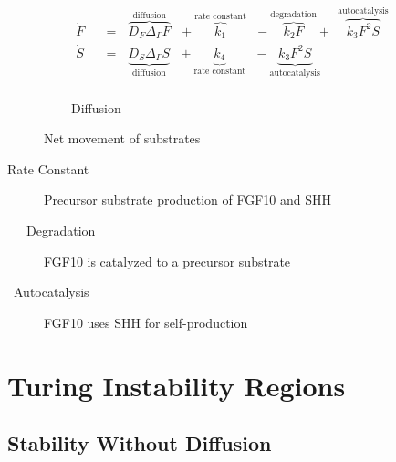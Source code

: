 \documentclass{beamer}
\begin{document}
            \begin{frame}{\insertsubsectionhead}
                
                
                \begin{equation*}
                    \begin{aligned}
                    \dot{F} ~~~
                     &=~~~ \overbrace{D_F\Delta_\Gamma F}^\text{diffusion} ~~~
                    +\overbrace{k_1}^\text{rate constant} 
                    ~~~- \overbrace{k_2F}^\text{degradation} + 
                    ~~\overbrace{k_3F^2S}^\text{autocatalysis}&  \\
                    \dot{S} ~~~ 
                     &=~~~ \underbrace{D_S\Delta_\Gamma S}_\text{diffusion} 
                    ~~~+\underbrace{k_4}_\text{rate constant} 
                    ~~~-\underbrace{k_3F^2S}_\text{autocatalysis}&  \\
                    \end{aligned}
                \end{equation*}
                
                \begin{description}
                    \item[~~~~~~~~~~Diffusion] Net movement of substrates
                    \item[Rate Constant] Precursor substrate production of FGF10 and SHH
                    \item[~~~Degradation] FGF10 is catalyzed to a precursor substrate
                    \item[~Autocatalysis] FGF10 uses SHH for self-production
                \end{description}
                
            
            \end{frame}
        
    \section[Turing Regions]{Turing Instability Regions}
    
        \subsection{Stability Without Diffusion}
        
\end{document}
